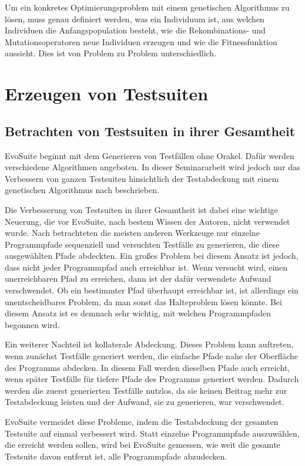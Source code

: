 \documentclass[a4paper,11pt]{article}
\begin{document}
Um ein konkretes Optimierungsproblem mit einem genetischen Algorithmus zu lösen, muss genau definiert werden, was ein Individuum ist, aus welchen Individuen die Anfangspopulation besteht, wie die Rekombinations- und Mutationsoperatoren neue Individuen erzeugen und wie die Fitnessfunktion aussieht.
Dies ist von Problem zu Problem unterschiedlich.

\section{Erzeugen von Testsuiten}
\label{sec:erzeugen_von_testsuiten}

\subsection{Betrachten von Testsuiten in ihrer Gesamtheit}

EvoSuite beginnt mit dem Generieren von Testfällen ohne Orakel.
Dafür werden verschiedene Algorithmen angeboten.
In dieser Seminararbeit wird jedoch nur das Verbessern von ganzen Testsuiten hinsichtlich der Testabdeckung mit einem genetischen Algorithmus nach \cite{TSE12_EvoSuite} beschrieben.

Die Verbesserung von Testsuiten in ihrer Gesamtheit ist dabei eine wichtige Neuerung, die vor EvoSuite, nach bestem Wissen der Autoren, nicht verwendet wurde.
Nach \cite{TSE12_EvoSuite} betrachteten die meisten anderen Werkzeuge nur einzelne Programmpfade sequenziell und versuchten Testfälle zu generieren, die diese ausgewählten Pfade abdeckten.
Ein großes Problem bei diesem Ansatz ist jedoch, dass nicht jeder Programmpfad auch erreichbar ist.
Wenn versucht wird, einen unerreichbaren Pfad zu erreichen, dann ist der dafür verwendete Aufwand verschwendet.
Ob ein bestimmter Pfad überhaupt erreichbar ist, ist allerdings ein unentscheidbares Problem, da man sonst das Halteproblem lösen könnte.
Bei diesem Ansatz ist es demnach sehr wichtig, mit welchen Programmpfaden begonnen wird.

Ein weiterer Nachteil ist kollaterale Abdeckung.
Dieses Problem kann auftreten, wenn zunächst Testfälle generiert werden, die einfache Pfade nahe der Oberfläche des Programms abdecken.
In diesem Fall werden dieselben Pfade auch erreicht, wenn später Testfälle für tiefere Pfade des Programms generiert werden.
Dadurch werden die zuerst generierten Testfälle nutzlos, da sie keinen Beitrag mehr zur Testabdeckung leisten und der Aufwand, sie zu generieren, war verschwendet.

EvoSuite vermeidet diese Probleme, indem die Testabdeckung der gesamten Testsuite auf einmal verbessert wird.
Statt einzelne Programmpfade auszuwählen, die erreicht werden sollen, wird bei EvoSuite gemessen, wie weit die gesamte Testsuite davon entfernt ist, alle Programmpfade abzudecken.
\end{document}
